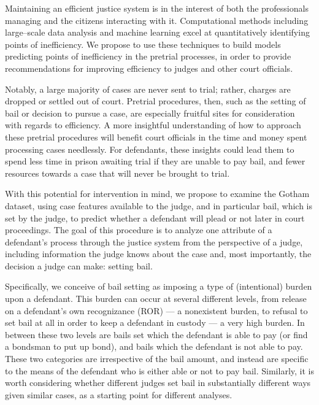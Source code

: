 Maintaining an efficient justice system is in the interest of both the professionals managing and the citizens interacting with it.
Computational methods including large--scale data analysis and machine learning excel at quantitatively identifying points of inefficiency.
We propose to use these techniques to build models predicting points of inefficiency in the pretrial processes,
in order to provide recommendations for improving efficiency to judges and other court officials.

Notably,
a large majority of cases are never sent to trial; rather,
charges are dropped or settled out of court.
Pretrial procedures,
then,
such as the setting of bail or decision to pursue a case,
are especially fruitful sites for consideration with regards to efficiency.
A more insightful understanding of how to approach these pretrial procedures will benefit court officials in the time and money spent processing cases needlessly.
For defendants,
these insights could lead them to spend less time in prison awaiting trial if they are unable to pay bail,
and fewer resources towards a case that will never be brought to trial.


With this potential for intervention in mind,
we propose to examine the Gotham dataset,
using case features available to the judge,
and in particular bail,
which is set by the judge,
to predict whether a defendant will plead or not later in court proceedings.
The goal of this procedure is to analyze one attribute of a defendant's process through the justice system from the perspective of a judge,
including information the judge knows about the case and,
most importantly,
the decision a judge can make: setting bail.


Specifically,
we conceive of bail setting as imposing a type of (intentional) burden upon a defendant.
This burden can occur at several different levels,
from release on a defendant's own recognizance (ROR) --- a nonexistent burden,
to refusal to set bail at all in order to keep a defendant in custody --- a very high burden.
In between these two levels are bails set which the defendant is able to pay (or find a bondsman to put up bond),
and bails which the defendant is not able to pay.
These two categories are irrespective of the bail amount,
and instead are specific to the means of the defendant who is either able or not to pay bail.
Similarly,
it is worth considering whether different judges set bail in substantially different ways given similar cases,
as a starting point for different analyses.


